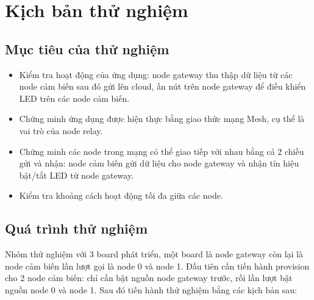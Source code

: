 \chapter{Kịch bản thử nghiệm} \label{chap:experiment}
    \section{Mục tiêu của thử nghiệm}
    \begin{itemize}
        \item Kiểm tra hoạt động của ứng dụng: node gateway thu thập dữ liệu từ các node cảm biến sau đó gửi lên cloud, ấn nút trên node gateway để điều khiển LED trên các node cảm biến.
        \item Chứng minh ứng dụng được hiện thực bằng giao thức mạng Mesh, cụ thể là vai trò của node relay.
        \item Chứng minh các node trong mạng có thể giao tiếp với nhau bằng cả 2 chiều gửi và nhận: node cảm biến gửi dữ liệu cho node gateway và nhận tín hiệu bật/tắt LED từ node gateway.
        \item Kiểm tra khoảng cách hoạt động tối đa giữa các node.
    \end{itemize}
    \section{Quá trình thử nghiệm}
        Nhóm thử nghiệm với 3 board phát triển, một board là node gateway còn lại là node cảm biến lần lượt gọi là node 0 và node 1. Đầu tiên cần tiến hành provision cho 2 node cảm biến: chỉ cần bật nguồn node gateway trước, rồi lần lượt bật nguồn node 0 và node 1. Sau đó tiến hành thử nghiệm bằng các kịch bản sau:
